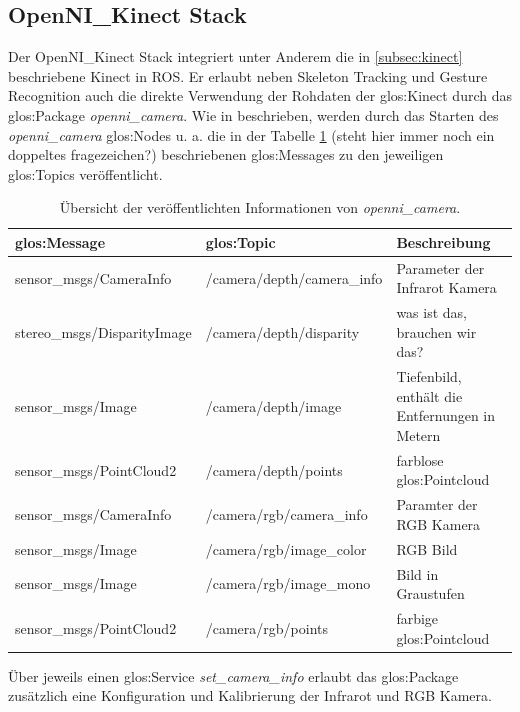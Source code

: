 \subsection{OpenNI\_Kinect Stack}

Der OpenNI\_Kinect Stack integriert unter Anderem die in \ref{subsec:kinect} beschriebene Kinect in \gls{ROS}. Er erlaubt neben Skeleton Tracking und Gesture Recognition auch die direkte Verwendung der Rohdaten der \gls{glos:Kinect} durch das \gls{glos:Package} \emph{openni\_camera}. Wie in \cite{online:rosopenni_camera} beschrieben, werden durch das Starten des \emph{openni\_camera} \glspl{glos:Node} u. a. die in der Tabelle \ref{tab:opennicameramsgs} {\color{red} (steht hier immer noch ein doppeltes fragezeichen?)} beschriebenen \glspl{glos:Message} zu den jeweiligen \glspl{glos:Topic} veröffentlicht.
\begin{table}
\label{tab:opennicameramsgs}
\begin{tabular}{ l l p{4.3cm} }
	\hline
	\gls{glos:Message}			&	\gls{glos:Topic}						& 	Beschreibung\\
	\hline
	sensor\_msgs/CameraInfo		&	/camera/depth/camera\_info			&	Parameter der Infrarot Kamera\\
	stereo\_msgs/DisparityImage	&	/camera/depth/disparity				&	{\color{red}was ist das, brauchen wir das?}\\
	sensor\_msgs/Image			&	/camera/depth/image					&	Tiefenbild, enthält die Entfernungen in Metern\\
	sensor\_msgs/PointCloud2		&	/camera/depth/points					&	farblose \gls{glos:Pointcloud}\\
	\hline
	sensor\_msgs/CameraInfo		&	/camera/rgb/camera\_info				&	Paramter der RGB Kamera\\
	sensor\_msgs/Image			&	/camera/rgb/image\_color				&	RGB Bild\\
	sensor\_msgs/Image			&	/camera/rgb/image\_mono				&	Bild in Graustufen\\
	sensor\_msgs/PointCloud2		&	/camera/rgb/points					&	farbige \gls{glos:Pointcloud}\\
	\hline
\end{tabular}
\caption[Topic-Übersicht von openni\_camera]{Übersicht der veröffentlichten Informationen von \emph{openni\_camera}.}
\end{table}
Über jeweils einen \gls{glos:Service} \emph{set\_camera\_info} erlaubt das \gls{glos:Package} zusätzlich eine Konfiguration und Kalibrierung der Infrarot und RGB Kamera.

